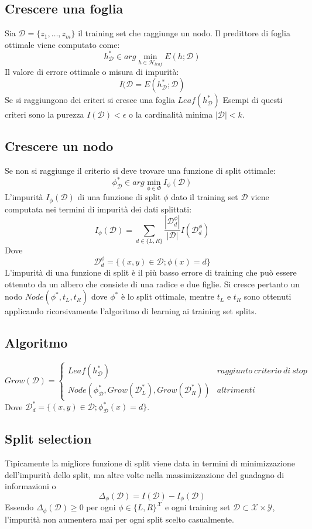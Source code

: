 	\subsection{Crescere una foglia}
	Sia $\mathcal{D}=\{z_1, \dots, z_m\}$ il training set che raggiunge un nodo.
	Il predittore di foglia ottimale viene computato come:
	$$h^*_\mathcal{D}\in arg\min\limits_{h\in\mathcal{H}_{leaf}} E(h; \mathcal{D})$$
	Il valore di errore ottimale o misura di impurit\`a:
	$$I(\mathcal{D} = E(h^*_\mathcal{D};\mathcal{D})$$
	Se si raggiungono dei criteri si cresce una foglia $Leaf(h^*_\mathcal{D})$
	Esempi di questi criteri sono la purezza $I(\mathcal{D}) < \epsilon$ o la cardinalit\`a minima $|\mathcal{D}|<k$.

	\subsection{Crescere un nodo}
	Se non si raggiunge il criterio si deve trovare una funzione di split ottimale:
	$$\phi^*_\mathcal{D}\in arg\min\limits_{\phi\in\Phi}I_\phi(\mathcal{D})$$
	L'impurit\`a $I_\phi(\mathcal{D})$ di una funzione di split $\phi$ dato il training set $\mathcal{D}$ viene computata nei termini di impurit\`a dei dati splittati:
	$$I_\phi(\mathcal{D})=\sum\limits_{d\in\{L,R\}}\dfrac{|\mathcal{D}^\phi_d|}{|\mathcal{D}|}I(\mathcal{D}^\phi_d)$$
	Dove
	$$\mathcal{D}^\phi_d = \{(x, y)\in\mathcal{D};\phi(x)=d\}$$
	L'impurit\`a di una funzione di split \`e il pi\`u basso errore di training che pu\`o essere ottenuto da un albero che consiste di una radice e due figlie.
	Si cresce pertanto un nodo $Node(\phi^*, t_L, t_R)$ dove $\phi^*$ \`e lo split ottimale, mentre $t_L$ e $t_R$ sono ottenuti applicando ricorsivamente l'algoritmo di learning ai training set splits.

	\subsection{Algoritmo}
		$$Grow(\mathcal{D})=\begin{cases}Leaf(h^*_\mathcal{D}) &raggiunto\ criterio\ di\ stop\\
			 									 Node(\phi^*_\mathcal{D}, Grow(\mathcal{D}^*_L), Grow(\mathcal{D}^*_R)) &altrimenti
						\end{cases}$$
	Dove $\mathcal{D}^*_d=\{(x, y)\in\mathcal{D};\phi^*_\mathcal{D}(x)=d\}$.

	\subsection{Split selection}
	Tipicamente la migliore funzione di split viene data in termini di minimizzazione dell'impurit\`a dello split, ma altre volte nella massimizzazione del guadagno di informazioni o
	$$\Delta_\phi(\mathcal{D})=I(\mathcal{D})-I_\phi(\mathcal{D})$$
	Essendo $\Delta_\phi(\mathcal{D})\ge 0$ per ogni $\phi\in\{L,R\}^{\mathcal{X}}$ e ogni training set $\mathcal{D}\subset\mathcal{X}\times\mathcal{Y}$, l'impurit\`a non aumentera mai per ogni split scelto casualmente.

